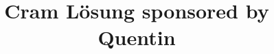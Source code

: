 \documentclass{article}
\title{Cram Lösung sponsored by Quentin}
\begin{document}
 
\maketitle 

\\
\end{document}
